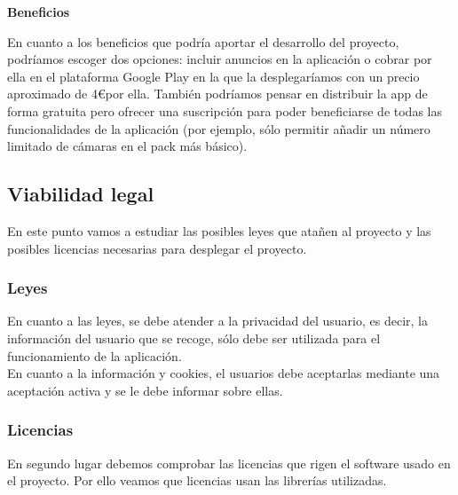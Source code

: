 \textbf{Beneficios}

En cuanto a los beneficios que podría aportar el desarrollo del proyecto, podríamos escoger dos opciones: incluir anuncios en la aplicación o cobrar por ella en el plataforma Google Play en la que la desplegaríamos con un precio aproximado de 4\euro por ella. También podríamos pensar en distribuir la app de forma gratuita pero ofrecer una suscripción para poder beneficiarse de todas las funcionalidades de la aplicación (por ejemplo, sólo permitir añadir un número limitado de cámaras en el pack más básico).

\subsection{Viabilidad legal}

En este punto vamos a estudiar las posibles leyes que atañen al proyecto y las posibles licencias necesarias para desplegar el proyecto.

\subsubsection{Leyes}

En cuanto a las leyes, se debe atender a la privacidad del usuario, es decir, la información del usuario que se recoge, sólo debe ser utilizada para el funcionamiento de la aplicación. \\
En cuanto a la información y cookies, el usuarios debe aceptarlas mediante una aceptación activa y se le debe informar sobre ellas.

\subsubsection{Licencias}

En segundo lugar debemos comprobar las licencias que rigen el software usado en el proyecto.
Por ello veamos que licencias usan las librerías utilizadas.

